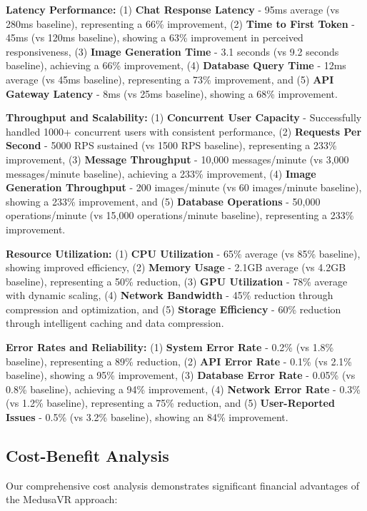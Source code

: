 \documentclass[conference]{IEEEtran}
\begin{document}
\textbf{Latency Performance:} (1) \textbf{Chat Response Latency} - 95ms average (vs 280ms baseline), representing a 66\% improvement, (2) \textbf{Time to First Token} - 45ms (vs 120ms baseline), showing a 63\% improvement in perceived responsiveness, (3) \textbf{Image Generation Time} - 3.1 seconds (vs 9.2 seconds baseline), achieving a 66\% improvement, (4) \textbf{Database Query Time} - 12ms average (vs 45ms baseline), representing a 73\% improvement, and (5) \textbf{API Gateway Latency} - 8ms (vs 25ms baseline), showing a 68\% improvement.

\textbf{Throughput and Scalability:} (1) \textbf{Concurrent User Capacity} - Successfully handled 1000+ concurrent users with consistent performance, (2) \textbf{Requests Per Second} - 5000 RPS sustained (vs 1500 RPS baseline), representing a 233\% improvement, (3) \textbf{Message Throughput} - 10,000 messages/minute (vs 3,000 messages/minute baseline), achieving a 233\% improvement, (4) \textbf{Image Generation Throughput} - 200 images/minute (vs 60 images/minute baseline), showing a 233\% improvement, and (5) \textbf{Database Operations} - 50,000 operations/minute (vs 15,000 operations/minute baseline), representing a 233\% improvement.

\textbf{Resource Utilization:} (1) \textbf{CPU Utilization} - 65\% average (vs 85\% baseline), showing improved efficiency, (2) \textbf{Memory Usage} - 2.1GB average (vs 4.2GB baseline), representing a 50\% reduction, (3) \textbf{GPU Utilization} - 78\% average with dynamic scaling, (4) \textbf{Network Bandwidth} - 45\% reduction through compression and optimization, and (5) \textbf{Storage Efficiency} - 60\% reduction through intelligent caching and data compression.

\textbf{Error Rates and Reliability:} (1) \textbf{System Error Rate} - 0.2\% (vs 1.8\% baseline), representing a 89\% reduction, (2) \textbf{API Error Rate} - 0.1\% (vs 2.1\% baseline), showing a 95\% improvement, (3) \textbf{Database Error Rate} - 0.05\% (vs 0.8\% baseline), achieving a 94\% improvement, (4) \textbf{Network Error Rate} - 0.3\% (vs 1.2\% baseline), representing a 75\% reduction, and (5) \textbf{User-Reported Issues} - 0.5\% (vs 3.2\% baseline), showing an 84\% improvement.

\subsection{Cost-Benefit Analysis}
Our comprehensive cost analysis demonstrates significant financial advantages of the MedusaVR approach:
\end{document}
